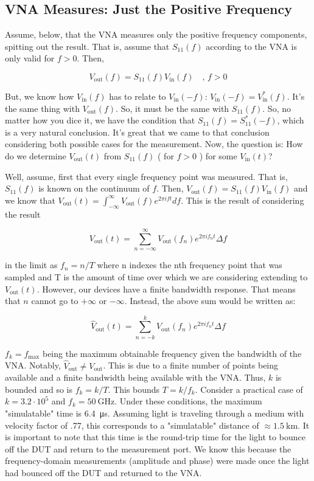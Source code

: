 \documentclass{article}
\begin{document}
\subsection{VNA Measures: Just the Positive Frequency}
\label{sub:vna_measures_just_the_positive_frequency}
Assume, below, that the VNA measures only the positive frequency components,
spitting out the result. That is, assume that $ S_{11}(f) $ according to the VNA
is only valid for $ f > 0 $. Then,

\[
   V_{\text{out}}(f) = S_{11}(f) V_{\text{in}}(f) \quad,\, f > 0
\]

But, we know how $ V_{\text{in}}(f) $ has to relate to $ V_{\text{in}}(-f) $: $
V_{\text{in}}(-f) = V_{\text{in}}^*(f)$. It's the same thing with $
V_{\text{out}}(f) $. So, it must be the same with $ S_{11}(f) $. So, no matter
how you dice it, we have the condition that $ S_{11}(f) = S_{11}^*(-f) $, which
is a very natural conclusion. It's great that we came to that conclusion
considering both possible cases for the measurement. Now, the question is: How
do we determine $ V_{\text{out}}(t) $ from $ S_{11}(f) $ ( for $ f > 0 $ ) for
some $ V_{\text{in}}(t) $?

Well, assume, first that every single frequency point was measured. That is, $
S_{11}(f) $ is known on the continuum of $ f $. Then, $ V_{\text{out}}(f) =
S_{11}(f) V_{\text{in}}(f) $ and we know that $ V_{\text{out}}(t) =
\int_{-\infty}^{\infty} V_{\text{out}}(f) e^{2 \pi i f t} df  $. This is the
result of considering the result

\[
   V_{\text{out}}(t) = \sum^{\infty}_{n = -\infty}  V_{\text{out}}(f_n) e^{2 \pi i
   f_n t} \Delta f
\]

in the limit as $ f_n = n / T $ where n indexes the nth frequency point that was
sampled and T is the amount of time over which we are considering extending to $
V_{\text{out}}(t) $. However, our devices have a finite bandwidth response. That
means that $ n $ cannot go to $ + \infty $ or $ - \infty $. Instead, the above
sum would be written as:

\[
   \hat{V}_{\text{out}}(t) = \sum^{k}_{n = - k}  V_{\text{out}}(f_n) e^{2 \pi i
   f_n t} \Delta f
\]

$ f_k = f_{\text{max}} $ being the maximum obtainable frequency given the
bandwidth of the VNA. Notably, $ \hat{V}_{\text{out}} \ne V_{\text{out}} $. This
is due to a finite number of points being available and a finite bandwidth being
available with the VNA. Thus, $ k $ is bounded and so is $ f_{k} = k / T $. This
bounds $ T =  k / f_{k} $. Consider a practical case of $ k = 3.2 \cdot 10^{5} $ and $
f_k =  \SI{50}{\giga\hertz} $. Under these conditions, the maximum "simulatable"
time is \SI{6.4}{\micro\second}. Assuming light is traveling through a medium
with velocity factor of .77, this corresponds to a "simulatable" distance of $
\approx \SI{1.5}{\kilo\meter} $. It is important to note that this time is the
round-trip time for the light to bounce off the DUT and return to the
measurement port. We know this because the frequency-domain measurements
(amplitude and phase) were made once the light had bounced off the DUT and
returned to the VNA.
\end{document}
